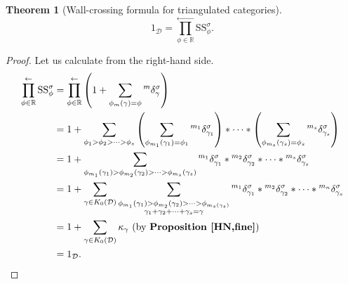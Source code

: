 \documentclass[a4paper,12pt]{amsart}
\newtheorem{theorem}{Theorem}[section]
\newcommand{\Ss}{\mathrm{SS}}
\begin{document}
\begin{theorem}[Wall-crossing formula for triangulated categories]
    \[1_\mathcal{D}=\prod^\leftarrow_{\phi\in\mathbb{R}}\Ss^\sigma_\phi.\]
\end{theorem}
\begin{proof}
    Let us calculate from the right-hand side.
    \begin{align*}
        \prod^\leftarrow_{\phi\in\mathbb{R}}\Ss^\sigma_\phi&=\prod^\leftarrow_{\phi\in\mathbb{R}}\left(1+\sum_{\phi_m(\gamma)=\phi}{^m}\delta^\sigma_\gamma\right)\\
        &=1+\sum_{\phi_1>\phi_2>\dots>\phi_s}\left(\sum_{\phi_{m_1}(\gamma_1)=\phi_1}{^{m_1}}\delta^\sigma_{\gamma_1}\right)*\dots*\left(\sum_{\phi_{m_s}(\gamma_s)=\phi_s}{^{m_s}}\delta^\sigma_{\gamma_s}\right)\\
        &=1+\sum_{\phi_{m_1}(\gamma_1)>\phi_{m_2}(\gamma_2)>\dots>\phi_{m_s}(\gamma_s)}{^{m_1}}\delta^\sigma_{\gamma_1}*{^{m_2}}\delta^\sigma_{\gamma_2}*\dots*{^{m_s}}\delta^\sigma_{\gamma_s}\\
        &=1+\sum_{\gamma\in K_0(\mathcal{D})}\sum_{\begin{subarray}{c}
         \\{\phi_{m_1}(\gamma_1)>\phi_{m_2}(\gamma_2)>\dots>\phi_{m_s(\gamma_s)}}\\
        \gamma_1+\gamma_2+\dots+\gamma_s=\gamma
    \end{subarray}}{^{m_1}}\delta^\sigma_{\gamma_1}*{^{m_2}}\delta^\sigma_{\gamma_2}*\dots*{^{m_n}}\delta^\sigma_{\gamma_s}\\
    &=1+\sum_{\gamma\in K_0(\mathcal{D})}\kappa_\gamma\text{ (by \textbf{Proposition \ref{HN,fine}})}\\
    &=1_\mathcal{D}.
    \end{align*}
\end{proof}
\end{document}
